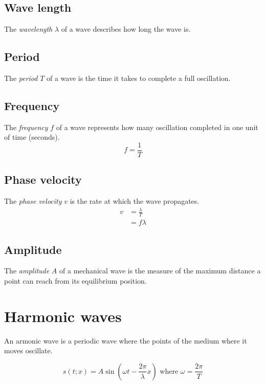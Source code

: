 \documentclass[a4paper]{article}
\begin{document}
\subsection{Wave length}

The \textit{wavelength} \(\lambda\) of a wave describes how long the wave is.

\subsection{Period}

The \textit{period} \(T\) of a wave is the time it takes to complete
a full oscillation.

\subsection{Frequency}

The \textit{frequency} \(f\) of a wave represents how many oscillation
completed in one unit of time (seconds).
\[
    f = \frac{1}{T}
\]

\subsection{Phase velocity}

The \textit{phase velocity} \(v\) is the rate at which
the wave propagates.
\begin{align*}
    v &= \frac{\lambda}{T} \\
    &= f\lambda
\end{align*}

\subsection{Amplitude}

The \textit{amplitude} \(A\) of a mechanical wave is the
measure of the maximum distance a point can reach
from its equilibrium position.

\pagebreak

\section{Harmonic waves}

An armonic wave is a periodic wave where
the points of the medium where it moves oscillate.

\[
    s(t;x) = A \sin
    \left(
        \omega t - \frac{2\pi}{\lambda}x
    \right)
    \text{ where } \omega = \frac{2\pi}{T}
\]
\end{document}
